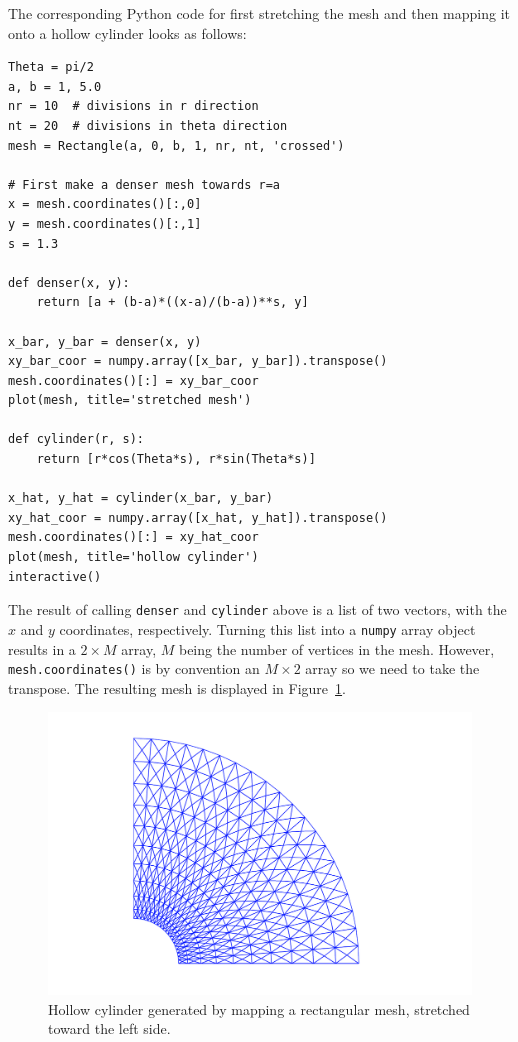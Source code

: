 The corresponding Python code for first stretching the mesh and
then mapping it onto a hollow cylinder looks as follows:
\begin{Verbatim}[fontsize=\fontsize{10pt}{10pt},tabsize=8,baselinestretch=1.05,
fontfamily=tt,xleftmargin=7mm]
Theta = pi/2
a, b = 1, 5.0
nr = 10  # divisions in r direction
nt = 20  # divisions in theta direction
mesh = Rectangle(a, 0, b, 1, nr, nt, 'crossed')

# First make a denser mesh towards r=a
x = mesh.coordinates()[:,0]
y = mesh.coordinates()[:,1]
s = 1.3

def denser(x, y):
    return [a + (b-a)*((x-a)/(b-a))**s, y]

x_bar, y_bar = denser(x, y)
xy_bar_coor = numpy.array([x_bar, y_bar]).transpose()
mesh.coordinates()[:] = xy_bar_coor
plot(mesh, title='stretched mesh')

def cylinder(r, s):
    return [r*cos(Theta*s), r*sin(Theta*s)]

x_hat, y_hat = cylinder(x_bar, y_bar)
xy_hat_coor = numpy.array([x_hat, y_hat]).transpose()
mesh.coordinates()[:] = xy_hat_coor
plot(mesh, title='hollow cylinder')
interactive()
\end{Verbatim}
\noindent
The result of calling {\fontsize{12pt}{12pt}\texttt{denser}} and {\fontsize{12pt}{12pt}\texttt{cylinder}} above is a list of two
vectors, with the $x$ and $y$ coordinates, respectively.
Turning this list into a {\fontsize{12pt}{12pt}\texttt{numpy}} array object results in a $2\times M$
array, $M$ being the number of vertices in the mesh. However,
{\fontsize{12pt}{12pt}\texttt{mesh.coordinates()}} is by convention an $M\times 2$ array so we
need to take the transpose. The resulting mesh is displayed
in Figure~\ref{langtangen:mesh:transform:cyl:fig1}.
\begin{figure}
  \begin{center}
    \centerline{
      {\includegraphics[width=0.9\linewidth]{chapters/langtangen/pdf/hollow_cylinder.pdf}}}
    \caption{Hollow cylinder generated by mapping a rectangular mesh, stretched toward
      the left side.}
    \label{langtangen:mesh:transform:cyl:fig1}
  \end{center}
\end{figure}


